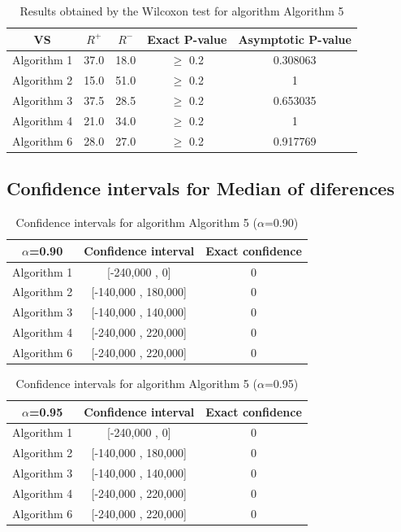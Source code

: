 \documentclass[a4paper,10pt]{article}
\begin{document}
\begin{table}[!htp]
\centering\small
\begin{tabular}{
|c|c|c|c|c|}
\hline
 VS & $R^{+}$ & $R^{-}$ & Exact P-value & Asymptotic P-value \\ \hline 
Algorithm 1 & 37.0 & 18.0 & $\geq$ 0.2 & 0.308063\\ \hline 
Algorithm 2 & 15.0 & 51.0 & $\geq$ 0.2 & 1\\ \hline 
Algorithm 3 & 37.5 & 28.5 & $\geq$ 0.2 & 0.653035\\ \hline 
Algorithm 4 & 21.0 & 34.0 & $\geq$ 0.2 & 1\\ \hline 
Algorithm 6 & 28.0 & 27.0 & $\geq$ 0.2 & 0.917769\\ \hline 

\end{tabular}
\caption{Results obtained by the Wilcoxon test for algorithm Algorithm 5}
\end{table}

\subsection{Confidence intervals for Median of diferences}

\begin{table}[!htp]
\centering\small
\begin{tabular}{
|c|c|c|}
\hline
 $\alpha$=0.90 & Confidence interval & Exact confidence \\ \hline 
Algorithm 1 & [-240,000 , 0] & 0\\ \hline 
Algorithm 2 & [-140,000 , 180,000] & 0\\ \hline 
Algorithm 3 & [-140,000 , 140,000] & 0\\ \hline 
Algorithm 4 & [-240,000 , 220,000] & 0\\ \hline 
Algorithm 6 & [-240,000 , 220,000] & 0\\ \hline 

\end{tabular}
\caption{Confidence intervals for algorithm Algorithm 5 ($\alpha$=0.90)}
\end{table}
\begin{table}[!htp]
\centering\small
\begin{tabular}{
|c|c|c|}
\hline
 $\alpha$=0.95 & Confidence interval & Exact confidence \\ \hline 
Algorithm 1 & [-240,000 , 0] & 0\\ \hline 
Algorithm 2 & [-140,000 , 180,000] & 0\\ \hline 
Algorithm 3 & [-140,000 , 140,000] & 0\\ \hline 
Algorithm 4 & [-240,000 , 220,000] & 0\\ \hline 
Algorithm 6 & [-240,000 , 220,000] & 0\\ \hline 

\end{tabular}
\caption{Confidence intervals for algorithm Algorithm 5 ($\alpha$=0.95)}
\end{table}
\end{document}
